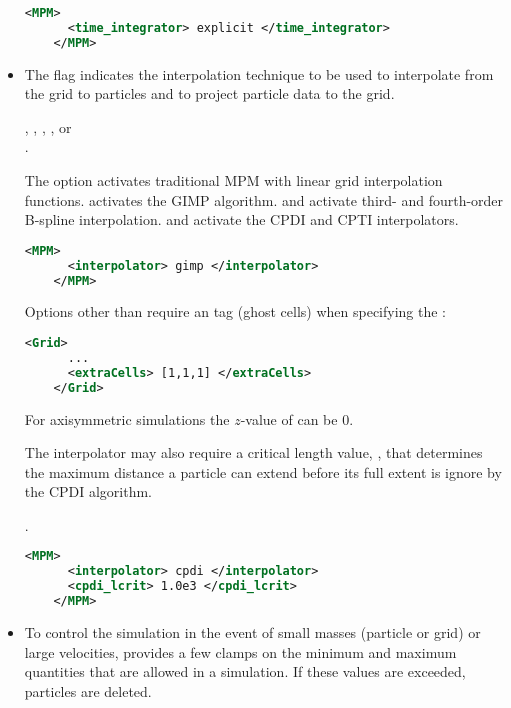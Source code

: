 \begin{itemize}
    \begin{lstlisting}[language=XML]
    <MPM>
      <time_integrator> explicit </time_integrator>
    </MPM>
    \end{lstlisting}

  \item {}  The  flag indicates the
    interpolation technique to be used to interpolate from the grid to particles
    and to project particle data to the grid.

     , , 
                       , , or  \\
     .

    The  option activates traditional MPM with linear grid interpolation
    functions.   activates the GIMP algorithm.  and
     activate third- and fourth-order B-spline interpolation.
     and  activate the CPDI and CPTI interpolators.
    \begin{lstlisting}[language=XML]
    <MPM>
      <interpolator> gimp </interpolator>
    </MPM>
    \end{lstlisting}

    Options other than  require an  tag
    (ghost cells) when specifying the :
    \begin{lstlisting}[language=XML]
    <Grid>
      ...
      <extraCells> [1,1,1] </extraCells>
    </Grid>
    \end{lstlisting}
    For axisymmetric simulations the $z$-value of  can be 0.

    The  interpolator may also require a critical length value,
    , 
    that determines the maximum distance a particle can extend before its full
    extent is ignore by the CPDI algorithm.

     .
    \begin{lstlisting}[language=XML]
    <MPM>
      <interpolator> cpdi </interpolator>
      <cpdi_lcrit> 1.0e3 </cpdi_lcrit>
    </MPM>
    \end{lstlisting}

  \item {} To control the simulation in the 
    event of small masses (particle or grid) or large velocities, \Vaango provides
    a few clamps on the minimum and maximum quantities that are allowed in a
    simulation.  If these values are exceeded, particles are deleted. 


\end{itemize}
